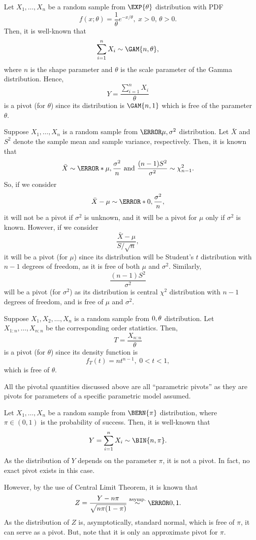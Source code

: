 \begin{Example}{}{}
    Let $ X_1,\ldots,X_n $ be a random sample from $ \EXP{\theta} $
    distribution with PDF
    \[ f(x;\theta)=\frac{1}{\theta}e^{-x/\theta},\; x>0,\, \theta>0. \]
    Then, it is well-known that
    \[ \sum_{i=1}^{n}X_i \sim \GAM{n,\theta}, \]
    where $ n $ is the shape parameter and $ \theta $ is the scale parameter
    of the Gamma distribution. Hence,
    \[ Y=\frac{\sum_{i=1}^{n}X_i}{\theta} \]
    is a pivot (for $ \theta $) since its distribution is $ \GAM{n,1} $
    which is free of the parameter $ \theta $.
\end{Example}
\begin{Example}{}{}
    Suppose $ X_1,\ldots,X_n $ is a random sample from
    $ \N{\mu,\sigma^2} $ distribution.
    Let $ \bar{X} $ and $ S^2 $ denote the sample mean
    and sample variance, respectively. Then, it
    is known that
    \[ \bar{X} \sim \N*{\mu,\frac{\sigma^2}{n}}\text{ and }\frac{(n-1)S^2}{\sigma^2}\sim \chi^2_{n-1}. \]
    So, if we consider
    \[ \bar{X}-\mu \sim \N*{0,\frac{\sigma^2}{n}}, \]
    it will not be a pivot if $ \sigma^2 $ is unknown, and it will be a pivot
    for $ \mu $ only if $ \sigma^2 $ is known. However,
    if we consider
    \[ \frac{\bar{X}-\mu}{S/\sqrt{n}}, \]
    it will be a pivot (for $ \mu $) since its distribution will be
    Student's $ t $ distribution with $ n-1 $ degrees of freedom,
    as it is free of both $ \mu $ and $ \sigma^2 $. Similarly,
    \[ \frac{(n-1)S^2}{\sigma^2} \]
    will be a pivot (for $ \sigma^2 $) as its distribution is central $ \chi^2 $
    distribution with $ n-1 $ degrees of freedom, and is free of $ \mu $
    and $ \sigma^2 $.
\end{Example}
\begin{Example}{}{}
    Suppose $ X_1,X_2,\ldots,X_n $ is a random sample from
    $ \relax{0,\theta} $ distribution. Let $ X_{1:n},\dots,X_{n:n} $
    be the corresponding order statistics. Then,
    \[ T=\frac{X_{n:n}}{\theta} \]
    is a pivot (for $ \theta $) since its density function is
    \[ f_T(t)=nt^{n-1},\; 0<t<1, \]
    which is free of $ \theta $.
\end{Example}
\begin{Remark}{}{}
    All the pivotal quantities discussed above are all
    ``parametric pivots'' as they are pivots for
    parameters of a specific parametric model assumed.
\end{Remark}
\begin{Example}{}{}
    Let $ X_1,\ldots,X_n $ be a random sample from
    $ \BERN{\pi} $ distribution, where $ \pi\in(0,1) $ is the probability
    of success. Then, it is well-known that
    \[ Y=\sum_{i=1}^{n}X_i \sim \BIN{n,\pi}. \]
    As the distribution of $ Y $ depends on the parameter $ \pi $,
    it is not a pivot. In fact, no exact pivot exists in this case.

    However, by the use of Central Limit Theorem, it is known that
    \[ Z=\frac{Y-n\pi}{\sqrt{n\pi(1-\pi)}}\stackrel{\text{asymp.}}{\sim}\N{0,1}. \]
    As the distribution of $ Z $ is, asymptotically, standard normal,
    which is free of $ \pi $, it can serve as a pivot. But, note that
    it is only an approximate pivot for $ \pi $.
\end{Example}
